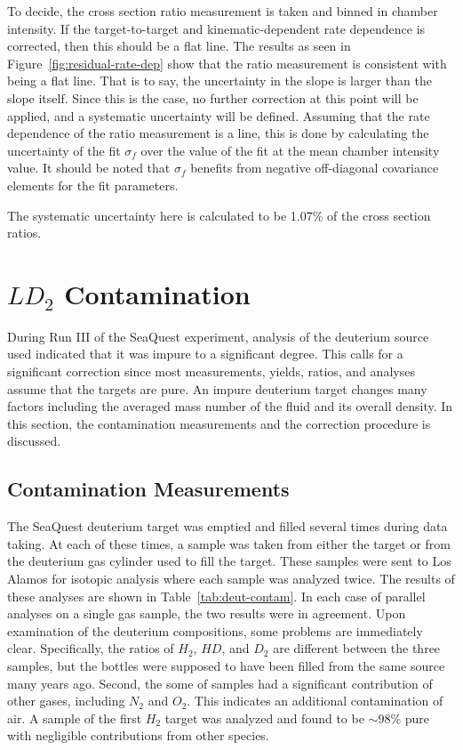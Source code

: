 To decide, the cross section ratio measurement is taken and binned in chamber intensity. If the target-to-target and kinematic-dependent rate dependence is corrected, then this should be a flat line. The results as seen in Figure~\ref{fig:residual-rate-dep} show that the ratio measurement is consistent with being a flat line. That is to say, the uncertainty in the slope is larger than the slope itself. Since this is the case, no further correction at this point will be applied, and a systematic uncertainty will be defined. Assuming that the rate dependence of the ratio measurement is a line, this is done by calculating the uncertainty of the fit $\sigma_f$ over the value of the fit at the mean chamber intensity value. It should be noted that $\sigma_f$ benefits from negative off-diagonal covariance elements for the fit parameters.

The systematic uncertainty here is calculated to be 1.07\% of the cross section ratios.

\section{$LD_2$ Contamination}

During Run III of the SeaQuest experiment, analysis of the deuterium source used indicated that it was impure to a significant degree. This calls for a significant correction since most measurements, yields, ratios, and analyses assume that the targets are pure. An impure deuterium target changes many factors including the averaged mass number of the fluid and its overall density. In this section, the contamination measurements and the correction procedure is discussed.

\subsection{Contamination Measurements}

The SeaQuest deuterium target was emptied and filled several times during data taking. At each of these times, a sample was taken from either the target or from the deuterium gas cylinder used to fill the target. These samples were sent to Los Alamos for isotopic analysis where each sample was analyzed twice. The results of these analyses are shown in Table~\ref{tab:deut-contam}. In each case of parallel analyses on a single gas sample, the two results were in agreement. Upon examination of the deuterium compositions, some problems are immediately clear. Specifically, the ratios of $H_2$, $HD$, and $D_2$ are different between the three samples, but the bottles were supposed to have been filled from the same source many years ago. Second, the some of samples had a significant contribution of other gases, including $N_2$ and $O_2$. This indicates an additional contamination of air. A sample of the first $H_2$ target was analyzed and found to be $\sim98\%$ pure with negligible contributions from other species.

